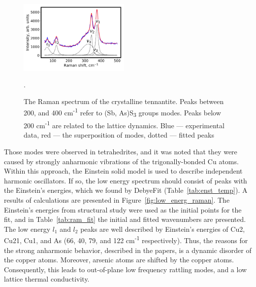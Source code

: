 \documentclass[preprint,review,12pt]{elsarticle}
\begin{document}
\begin{figure}[h]
\centering
\includegraphics[width=0.48\textwidth]{raman_25_CuAsS3_eng_components}
\caption{\label{fig:full_raman} The Raman spectrum of the crystalline tennantite. Peaks between 200, and 400 cm\textsuperscript{-1} refer to (Sb, As)S\textsubscript{3} groups modes\cite{Kharbish2007}. Peaks below 200 cm\textsuperscript{-1} are related to the lattice dynamics\cite{Buzatu2017}. Blue --- experimental data, red --- the superposition of modes, dotted --- fitted peaks}.
\end{figure}

Those modes were observed in tetrahedrites\cite{May2016}, and it was noted that they were caused by strongly anharmonic vibrations of the trigonally-bonded Cu atoms.
Within this approach, the Einstein solid model is used to describe independent harmonic oscillators.
If so, the low energy spectrum should consist of peaks with the Einstein's energies, which we found by DebyeFit (Table~\ref{tab:enst_temp}).
A results of calculations are presented in Figure~\ref{fig:low_energ_raman}.
The Einstein's energies from structural study were used as the initial points for the fit, and in Table~\ref{tab:ram_fit} the initial  and fitted wavenumbers are presented.
The low energy $l_{1}$ and $l_{2}$ peaks are well described by Einstein's energies of Cu2, Cu21, Cu1, and As (66, 40, 79, and 122 cm\textsuperscript{-1} respectively).
Thus, the reasons for the strong anharmonic behavior, described in the papers, is a dynamic disorder of the copper atoms. Moreover, arsenic atoms are shifted by the copper atoms.
Consequently, this leads to out-of-plane low frequency rattling modes, and a low lattice thermal conductivity.


\begin{table}
\caption{\label{tab:ram_fit}
Initial and fitted Einstein's energies. Initial energies are Einstein's energies from structural study.}
\centering
{}
\end{table}
\end{document}
